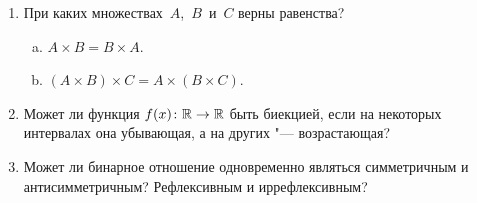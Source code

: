 \begin{enumerate}%
  \item При каких множествах~$A$,~$B$~и~$C$ верны равенства?
    \begin{enumerate}[a)]%
      \item $ A \times B = B \times A $.
      \item $ (A \times B) \times C = A \times (B \times C) $.
    \end{enumerate}
  \item Может ли функция $ f(x)\colon \mathbb R \to \mathbb R $ быть биекцией, если на некоторых интервалах она убывающая, а на других "--- возрастающая?
  \item Может ли бинарное отношение одновременно являться симметричным и антисимметричным? Рефлексивным и иррефлексивным?
\end{enumerate}